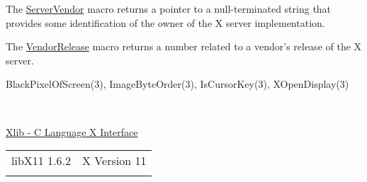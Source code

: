 \documentclass[]{article}
\renewcommand{\emph}[1]{\underline{#1}}
\begin{document}
The \emph{ServerVendor} macro returns a pointer to a null-terminated
string that provides some identification of the owner of the X server
implementation.

The \emph{VendorRelease} macro returns a number related to a vendor's
release of the X server.


BlackPixelOfScreen(3), ImageByteOrder(3), IsCursorKey(3),
XOpenDisplay(3)

~

\emph{Xlib - C Language X Interface}

\begin{longtable}[c]{@{}ll@{}}
\toprule\addlinespace
libX11 1.6.2 & X Version 11
\\\addlinespace
\bottomrule
\end{longtable}
\end{document}
